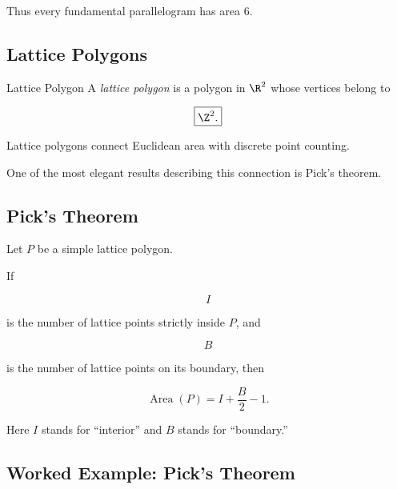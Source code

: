 Thus every fundamental parallelogram has area \(6\).

\subsection{Lattice Polygons}
\label{subsec:lattice-polygons}

\begin{definitionbox}{Lattice Polygon}
A \emph{lattice polygon} is a polygon in \(\R^2\) whose vertices belong to

\[
\boxed{\Z^2.}
\]
\end{definitionbox}

Lattice polygons connect Euclidean area with discrete point counting.

One of the most elegant results describing this connection is Pick's
theorem.

\subsection{Pick's Theorem}
\label{subsec:picks-theorem}

\begin{theorem}
Let \(P\) be a simple lattice polygon.

If

\[
I
\]

is the number of lattice points strictly inside \(P\), and

\[
B
\]

is the number of lattice points on its boundary, then

\[
\boxed{
\operatorname{Area}(P)
=
I+\frac{B}{2}-1.
}
\]
\end{theorem}

Here \(I\) stands for ``interior'' and \(B\) stands for ``boundary.''

\subsection{Worked Example: Pick's Theorem}
\label{subsec:worked-picks-theorem}

